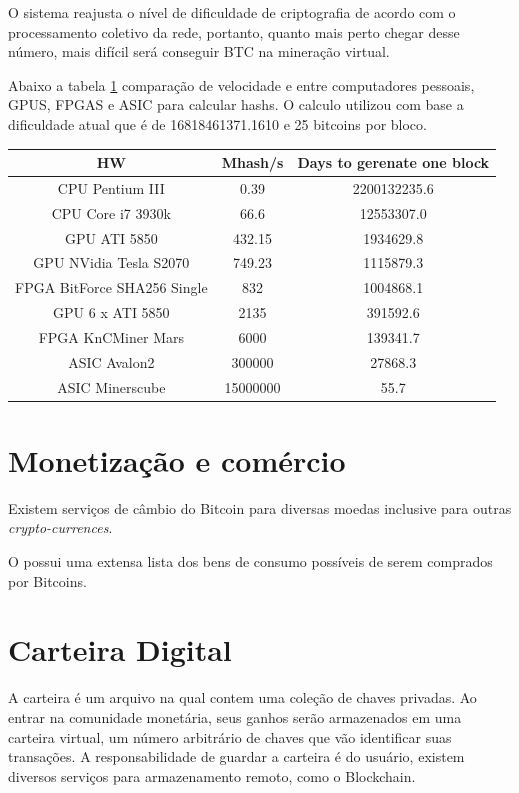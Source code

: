 \documentclass[a4paper,11pt]{article}
\theoremstyle{mytheor}
\begin{document}
O sistema reajusta o nível de dificuldade de criptografia de acordo com o processamento coletivo da rede, portanto, quanto mais perto chegar desse número, mais difícil será conseguir BTC na mineração virtual.

Abaixo a tabela \ref{compare} comparação de velocidade e entre computadores pessoais, GPUS, FPGAS e ASIC para calcular hashs. O calculo utilizou com base a dificuldade atual que é de 16818461371.1610 e 25 bitcoins por bloco.

\begin{table}[!ht]
\centering
\label{compare}
\scriptsize
\begin{tabular}{|c|c|c|}
\hline
\textbf{HW} & \textbf{Mhash/s} & \textbf{Days to gerenate one block} \\ \hline
CPU Pentium III & 0.39 & 2200132235.6 \\ \hline
CPU Core i7 3930k & 66.6 & 12553307.0 \\ \hline
GPU ATI 5850 & 432.15 & 1934629.8 \\ \hline
GPU NVidia Tesla S2070 & 749.23 & 1115879.3 \\ \hline
FPGA BitForce SHA256 Single & 832 & 1004868.1 \\ \hline
GPU 6 x ATI 5850 & 2135 & 391592.6 \\ \hline
FPGA KnCMiner Mars & 6000 & 139341.7 \\ \hline
ASIC Avalon2 & 300000 & 27868.3 \\ \hline
ASIC Minerscube & 15000000 & 55.7 \\ \hline  
\end{tabular}
\end{table}

\section*{Monetização e comércio}

Existem serviços de câmbio do Bitcoin para diversas moedas inclusive para outras \textit{crypto-currences}.

O \cite{trade} possui uma extensa lista dos bens de consumo possíveis de serem comprados por Bitcoins.

\section*{Carteira Digital}
A carteira é um arquivo na qual contem uma coleção de chaves privadas. Ao entrar na comunidade monetária, seus ganhos serão armazenados em uma carteira virtual, um  número arbitrário de chaves que vão identificar suas transações. A responsabilidade de guardar a carteira é do usuário, existem diversos serviços para armazenamento remoto, como o Blockchain.
\end{document}
